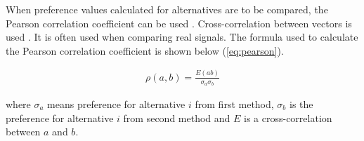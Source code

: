 When preference values calculated for alternatives are to be compared, the Pearson correlation coefficient can be used \cite{benesty2009pearson}. Cross-correlation between vectors is used \cite{zebende2011dcca}. It is often used when comparing real signals. The formula used to calculate the Pearson correlation coefficient is shown below (\ref{eq:pearson}).


\begin{equation}
\begin{array}{lcl}
\rho(a, b)=\frac{E(a b)}{\sigma_{a} \sigma_{b}}
\end{array}
\label{eq:pearson}
\end{equation}

where $\sigma_{a}$ means preference for alternative $i$ from first method, $\sigma_{b}$ is the preference for alternative $i$ from second method and $E$ is a cross-correlation between $a$ and $b$.
